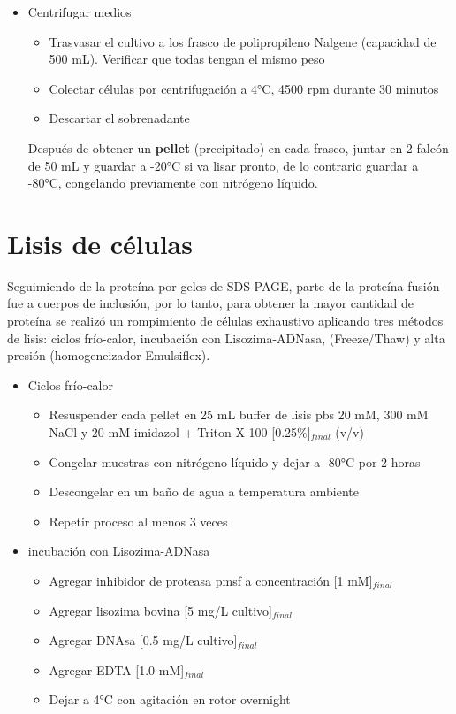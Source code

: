 \begin{appendix}
\begin{itemize}
        \item{Centrifugar medios}
    \begin{itemize}
        \item{Trasvasar el cultivo a los frasco de polipropileno Nalgene (capacidad de 500 mL). Verificar que todas tengan el mismo peso}
        \item{Colectar células por centrifugación a 4°C, 4500 \ac{rpm} durante 30 minutos}
        \item{Descartar el sobrenadante}
    \end{itemize}
    Después de obtener un \textbf{pellet} (precipitado) en cada frasco, juntar en 2 falcón de 50 mL y guardar a -20°C si va lisar pronto, de lo contrario guardar a -80°C, congelando previamente con nitrógeno líquido.
\end{itemize}

\section{Lisis de células}
Seguimiendo de la proteína por geles de \ac{SDS-PAGE}, parte de la proteína fusión fue a cuerpos de inclusión, por lo tanto, para obtener la mayor cantidad de proteína se realizó un rompimiento de células exhaustivo aplicando tres métodos de lisis: ciclos frío-calor, incubación con Lisozima-ADNasa, (Freeze/Thaw) y alta presión (homogeneizador Emulsiflex).


\begin{itemize}
\item{Ciclos frío-calor}
     \begin{itemize}
         \item{Resuspender cada pellet en 25 mL buffer de lisis \ac{pbs} 20 mM, 300 mM NaCl y 20 mM imidazol} + Triton X-100 [0.25$\%$]$_{final}$ (v/v)
        \item{Congelar muestras con nitrógeno líquido y dejar a -80°C por 2 horas}
        \item{Descongelar en un baño de agua a temperatura ambiente}
        \item{Repetir proceso al menos 3 veces}
    \end{itemize}
\end{itemize}

\begin{itemize}
\item{incubación con Lisozima-ADNasa}
     \begin{itemize}
        \item{Agregar inhibidor de proteasa \ac{pmsf} a concentración [1 mM]$_{final}$}
        \item{Agregar lisozima bovina [5 mg/L cultivo]$_{final}$}
        \item{Agregar DNAsa [0.5 mg/L cultivo]$_{final}$}
        \item{Agregar EDTA [1.0 mM]$_{final}$}
        \item{Dejar a 4°C con agitación en rotor overnight}
    \end{itemize}
\end{itemize}


\end{appendix}
